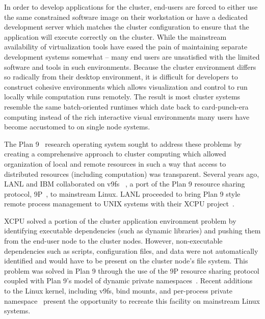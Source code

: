 In order to develop applications for the cluster, end-users are forced
to either use the same constrained software image on their workstation
or have a dedicated development server which matches the cluster configuration
to ensure that the application will execute correctly on the cluster.  While
the mainstream availability of virtualization tools have eased the pain of
maintaining separate development systems somewhat -- many end users are
unsatisfied with the limited software and tools in such environments.
Because the cluster environment differs so radically from their desktop
environment, it is difficult for developers to construct cohesive environments
which allows visualization and control to run locally while computation
runs remotely.  The result is most cluster systems resemble the same
batch-oriented runtimes which date back to card-punch-era computing instead
of the rich interactive visual environments many users have become accustomed
to on single node systems.

The Plan 9~\cite{pike95plan} research operating system sought to address
these problems by creating a comprehensive approach to cluster 
computing which allowed organization of local and remote resources in
such a way that access to distributed resources (including computation)
was transparent.  Several years ago, LANL and IBM collaborated on v9fs
~\cite{graverobbers}, a port of the Plan 9 resource sharing protocol,
9P~\cite{9p}, to mainstream Linux.
LANL proceeded to bring Plan 9 style remote process management to UNIX
systems with their XCPU project~\cite{ron-xcpu}.

XCPU solved a portion of the cluster application environment problem
by identifying executable dependencies (such as dynamic libraries) and 
pushing them from the end-user node to the cluster nodes.  However,
non-executable dependencies such as scripts, configuration files, and
data were not automatically identified and would have to be present
on the cluster node's file system.  This problem was solved in Plan 9
through the use of the 9P resource sharing protocol coupled with Plan 9's
model of dynamic private namespaces~\cite{namespace}.  Recent additions
to the Linux kernel, including v9fs, bind mounts, and per-process 
private namespace~\cite{linuxns} present the opportunity to recreate this 
facility on mainstream Linux systems.

